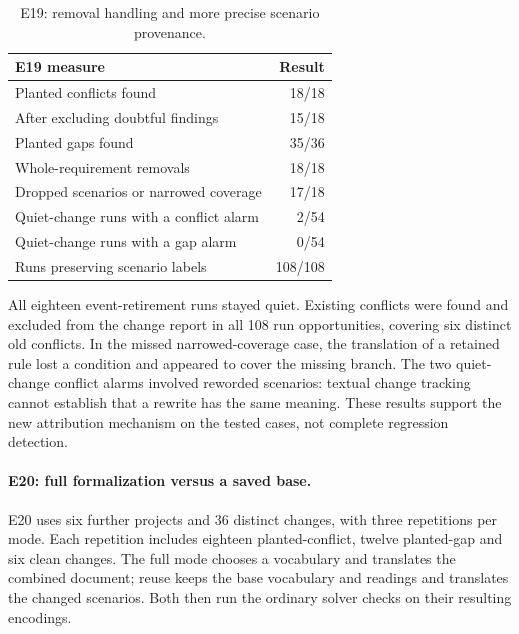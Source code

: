 \begin{table}[H]
\centering
\small
\begin{tabularx}{\linewidth}{@{}Xr@{}}
\toprule
E19 measure & Result \\
\midrule
Planted conflicts found & 18/18 \\
\quad After excluding doubtful findings & 15/18 \\
Planted gaps found & 35/36 \\
\quad Whole-requirement removals & 18/18 \\
\quad Dropped scenarios or narrowed coverage & 17/18 \\
Quiet-change runs with a conflict alarm & 2/54 \\
Quiet-change runs with a gap alarm & 0/54 \\
Runs preserving scenario labels & 108/108 \\
\bottomrule
\end{tabularx}
\caption{E19: removal handling and more precise scenario provenance.}
\label{tab:e19}
\end{table}

All eighteen event-retirement runs stayed quiet. Existing conflicts were found and excluded from the change report in all 108 run opportunities, covering six distinct old conflicts. In the missed narrowed-coverage case, the translation of a retained rule lost a condition and appeared to cover the missing branch. The two quiet-change conflict alarms involved reworded scenarios: textual change tracking cannot establish that a rewrite has the same meaning. These results support the new attribution mechanism on the tested cases, not complete regression detection.

\paragraph{E20: full formalization versus a saved base.}
E20 uses six further projects and 36 distinct changes, with three repetitions per mode. Each repetition includes eighteen planted-conflict, twelve planted-gap and six clean changes. The full mode chooses a vocabulary and translates the combined document; reuse keeps the base vocabulary and readings and translates the changed scenarios. Both then run the ordinary solver checks on their resulting encodings.

